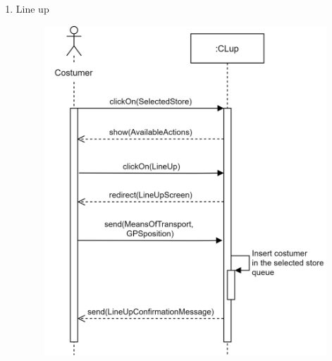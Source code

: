 \documentclass[]{article}
\begin{document}
\begin{enumerate}
						\item Line up
						\bigskip\bigskip\bigskip
						\begin{figure}[H]
							\centering
							\includegraphics[scale=1.3]{lineup.png}
							\caption{}
							\label{fig:lineup_sequencediagramm}
						\end{figure}
						\newpage	
						

\end{enumerate}
\end{document}
